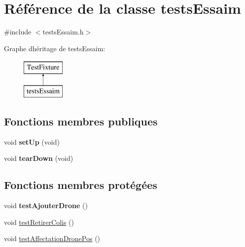 \hypertarget{classtests_essaim}{}\section{Référence de la classe tests\+Essaim}
\label{classtests_essaim}


{\ttfamily \#include $<$tests\+Essaim.\+h$>$}

Graphe d\textquotesingle{}héritage de tests\+Essaim\+:\begin{figure}[H]
\begin{center}
\leavevmode
\includegraphics[height=2.000000cm]{classtests_essaim}
\end{center}
\end{figure}
\subsection*{Fonctions membres publiques}
\begin{DoxyCompactItemize}
\item 
\mbox{\label{classtests_essaim_a11f3fd6586834e4fda0f7e2957e6f85d}} 
void {\bfseries set\+Up} (void)
\item 
\mbox{\label{classtests_essaim_aeffed1c0f08751a477df994ba6e7dd48}} 
void {\bfseries tear\+Down} (void)
\end{DoxyCompactItemize}
\subsection*{Fonctions membres protégées}
\begin{DoxyCompactItemize}
\item 
\mbox{\label{classtests_essaim_aecfe81de4a26fe35f16cfe73db6dd298}} 
void {\bfseries test\+Ajouter\+Drone} ()
\item 
void \mbox{\hyperlink{classtests_essaim_ac6af8267d8e85120a6b1e5b66b247f5b}{test\+Retirer\+Colis}} ()
\item 
void \mbox{\hyperlink{classtests_essaim_a602aca58210132a947410123c130665e}{test\+Affectation\+Drone\+Pos}} ()
\end{DoxyCompactItemize}


